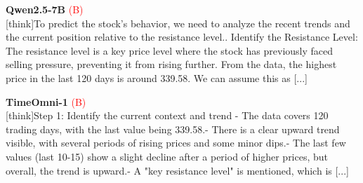 \noindent
\begin{minipage}[t]{0.28\textwidth}
\colorbox{red!8}{\parbox{\dimexpr\textwidth-2\fboxsep}{
\textbf{Qwen2.5-7B} \textcolor{red}{(B)} \\[2pt]
\tiny
[think]\newline To predict the stock's behavior, we need to analyze the recent trends and the current position relative to the resistance level.. Identify the Resistance Level: The resistance level is a key price level where the stock has previously faced selling pressure, preventing it from rising further. From the data, the highest price in the last 120 days is around 339.58. We can assume this as [...]
}}
\end{minipage}
\hfill
\begin{minipage}[t]{0.28\textwidth}
\colorbox{red!8}{\parbox{\dimexpr\textwidth-2\fboxsep}{
\textbf{TimeOmni-1} \textcolor{red}{(B)} \\[2pt]
\tiny
[think]\newline Step 1: Identify the current context and trend  \newline - The data covers 120 trading days, with the last value being 339.58.\newline - There is a clear upward trend visible, with several periods of rising prices and some minor dips.\newline - The last few values (last 10-15) show a slight decline after a period of higher prices, but overall, the trend is upward.\newline - A "key resistance level" is mentioned, which is [...]
}}
\end{minipage}
\hfill
